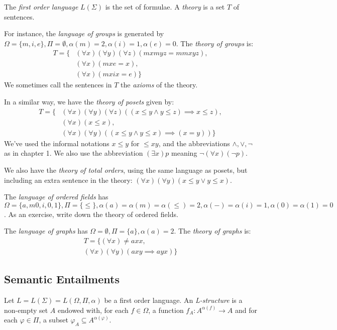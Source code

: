 \documentclass[10pt,a4paper]{article}
\begin{document}
The \emph{first order language} $L(\Sigma)$ is the set of formulae. A \emph{theory} is a set $T$ of sentences.

For instance, the \emph{language of groups} is generated by $\Omega = \{m,i,e\}, \Pi = \emptyset, \alpha(m) = 2, \alpha(i) = 1, \alpha(e) = 0$. The \emph{theory of groups} is:
\begin{align*}
T = \big\{&(\forall x)(\forall y)(\forall z)(mxmyz = mmxyz), \tag{associativity}\\
&(\forall x)(mxe = x), \tag{identity}\\
&(\forall x)(mxix = e)\big\} \tag{inverses}
\end{align*}
We sometimes call the sentences in $T$ the \emph{axioms} of the theory.

In a similar way, we have the \emph{theory  of posets} given by:
\begin{align*}
T = \big\{& (\forall x)(\forall y)(\forall z)((x \leq y \wedge y \leq z) \implies x \leq z),\\
&(\forall x)(x \leq x),\\
&(\forall x)(\forall y)((x \leq y \wedge y \leq x) \implies (x=y))\big\}
\end{align*}
We've used the informal notations $x \leq y$ for $\leq xy$, and the abbreviations $\wedge, \vee, \neg$ as in chapter 1. We also use the abbreviation $(\exists x)p$ meaning $\neg (\forall x)(\neg p)$.

We also have the \emph{theory of total orders}, using the same language as posets, but including an extra sentence in the theory: $(\forall x)(\forall y)(x \leq y \vee y \leq x)$. 

The \emph{language of ordered fields} has $\Omega = \{a, m  0, i, 0, 1\}, \Pi = \{\leq\}, \alpha(a) = \alpha(m) = \alpha(\leq) = 2, \alpha(-)= \alpha(i) = 1, \alpha(0) = \alpha(1) = 0$. As an exercise, write down the theory of ordered fields.

The \emph{language of graphs} has $\Omega = \emptyset, \Pi = \{a\}, \alpha(a) = 2$. The \emph{theory of graphs} is:
\begin{align*}
T = \{(\forall x) \neq a xx,\\
(\forall x)(\forall y)(axy \implies ayx)\}
\end{align*}

\subsection{Semantic Entailments}
Let $L = L(\Sigma) = L(\Omega, \Pi, \alpha)$ be a first order language. An \emph{L-structure} is a non-empty set $A$ endowed with, for each $f \in \Omega$, a function $f_A : A^{\alpha(f)} \to A$ and for each $\varphi \in \Pi$, a subset $\varphi_A \subseteq A^{\alpha(\varphi)}$.
\end{document}
